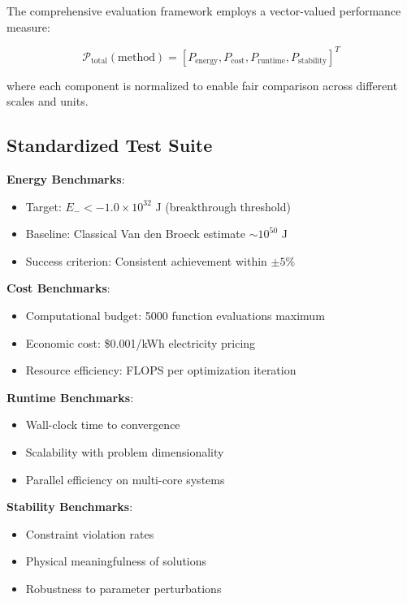 \documentclass[11pt,a4paper]{article}
\begin{document}
The comprehensive evaluation framework employs a vector-valued performance measure:

\begin{equation}
\mathcal{P}_{\text{total}}(\text{method}) = [P_{\text{energy}}, P_{\text{cost}}, P_{\text{runtime}}, P_{\text{stability}}]^T
\end{equation}

where each component is normalized to enable fair comparison across different scales and units.

\subsection{Standardized Test Suite}

\textbf{Energy Benchmarks}:
\begin{itemize}
\item Target: $E_- < -1.0 \times 10^{32}$ J (breakthrough threshold)
\item Baseline: Classical Van den Broeck estimate $\sim 10^{50}$ J
\item Success criterion: Consistent achievement within $\pm 5\%$
\end{itemize}

\textbf{Cost Benchmarks}:
\begin{itemize}
\item Computational budget: 5000 function evaluations maximum
\item Economic cost: \$0.001/kWh electricity pricing
\item Resource efficiency: FLOPS per optimization iteration
\end{itemize}

\textbf{Runtime Benchmarks}:
\begin{itemize}
\item Wall-clock time to convergence
\item Scalability with problem dimensionality
\item Parallel efficiency on multi-core systems
\end{itemize}

\textbf{Stability Benchmarks}:
\begin{itemize}
\item Constraint violation rates
\item Physical meaningfulness of solutions
\item Robustness to parameter perturbations
\end{itemize}
\end{document}
